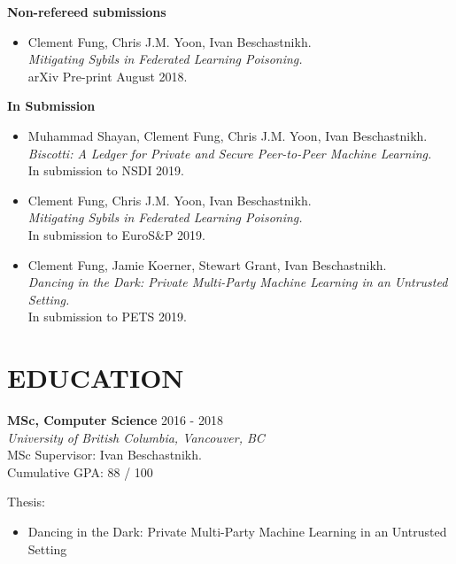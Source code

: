 \documentclass[10pt]{res} %
\begin{document}
\vspace{0.2in} %

\textbf{Non-refereed submissions} 
\begin{itemize}
\item Clement Fung, Chris J.M. Yoon, Ivan Beschastnikh.
\\
\emph{Mitigating Sybils in Federated Learning Poisoning.} \\ 
arXiv Pre-print August 2018.
\end{itemize}

\textbf{In Submission} 
\begin{itemize}
\item Muhammad Shayan, Clement Fung, Chris J.M. Yoon, Ivan Beschastnikh. 
\\
\emph{Biscotti: A Ledger for Private and Secure Peer-to-Peer Machine Learning.} \\ 
In submission to NSDI 2019.
\item Clement Fung, Chris J.M. Yoon, Ivan Beschastnikh.
\\
\emph{Mitigating Sybils in Federated Learning Poisoning.} \\ 
In submission to EuroS\&P 2019.
\item Clement Fung, Jamie Koerner, Stewart Grant, Ivan Beschastnikh.
\\
\emph{Dancing in the Dark: Private Multi-Party Machine Learning in an
Untrusted Setting.} \\ 
In submission to PETS 2019.
\end{itemize}


\section{EDUCATION} 

\vspace{0.2in} %

\textbf {MSc, Computer Science} \hfill 2016 - 2018 \\ 
{\sl University of British Columbia, Vancouver, BC} \\
MSc Supervisor: Ivan Beschastnikh. \\
Cumulative GPA: 88 / 100

Thesis:
\begin{itemize} 
    \item Dancing in the Dark: Private Multi-Party Machine Learning in an Untrusted Setting
\end{itemize}
\end{document}
